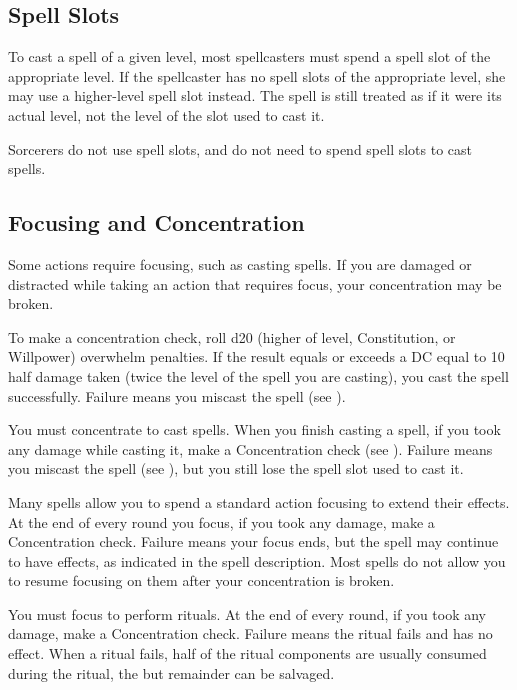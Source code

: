\subsection{Spell Slots}
To cast a spell of a given level, most spellcasters must spend a spell slot of the appropriate level. If the spellcaster has no spell slots of the appropriate level, she may use a higher-level spell slot instead. The spell is still treated as if it were its actual level, not the level of the slot used to cast it.

Sorcerers do not use spell slots, and do not need to spend spell slots to cast spells.

\subsection{Focusing and Concentration}\label{Concentration}\label{Focus}\label{Focusing and Concentration}

Some actions require focusing, such as casting spells.
If you are damaged or distracted while taking an action that requires focus, your concentration may be broken.

\label{Concentration Checks} To make a concentration check, roll d20 \add (higher of level, Constitution, or Willpower) \minus overwhelm penalties. If the result equals or exceeds a DC equal to 10 \add half damage taken \add (twice the level of the spell you are casting), you cast the spell successfully. Failure means you miscast the spell (see ).

 You must concentrate to cast spells. When you finish casting a spell, if you took any damage while casting it, make a Concentration check (see ). Failure means you miscast the spell (see ), but you still lose the spell slot used to cast it.

 Many spells allow you to spend a standard action focusing to extend their effects. At the end of every round you focus, if you took any damage, make a Concentration check. Failure means your focus ends, but the spell may continue to have effects, as indicated in the spell description. Most spells do not allow you to resume focusing on them after your concentration is broken.

 You must focus to perform rituals. At the end of every round, if you took any damage, make a Concentration check. Failure means the ritual fails and has no effect. When a ritual fails, half of the ritual components are usually consumed during the ritual, the but remainder can be salvaged.

